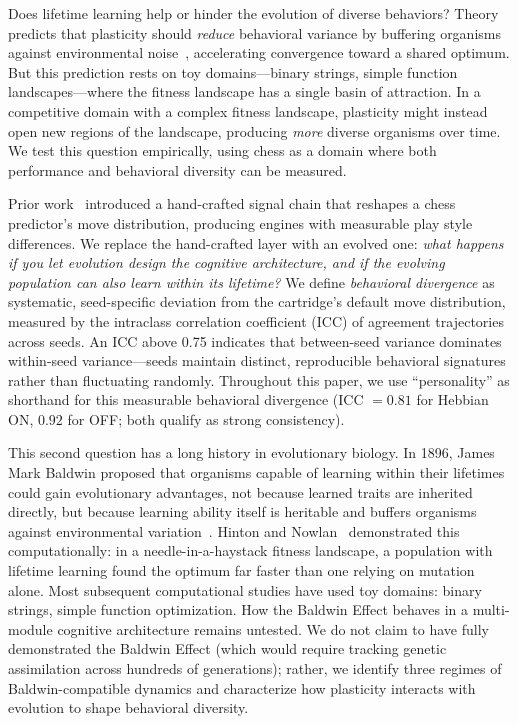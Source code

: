 \documentclass[11pt,a4paper]{article}
\begin{document}
Does lifetime learning help or hinder the evolution of diverse behaviors?
Theory predicts that plasticity should \emph{reduce} behavioral variance by buffering organisms against environmental noise~\citep{paenke2009baldwin}, accelerating convergence toward a shared optimum.
But this prediction rests on toy domains---binary strings, simple function landscapes---where the fitness landscape has a single basin of attraction.
In a competitive domain with a complex fitness landscape, plasticity might instead open new regions of the landscape, producing \emph{more} diverse organisms over time.
We test this question empirically, using chess as a domain where both performance and behavioral diversity can be measured.

Prior work~\citep{resendez2026ailed} introduced a hand-crafted signal chain that reshapes a chess predictor's move distribution, producing engines with measurable play style differences.
We replace the hand-crafted layer with an evolved one: \emph{what happens if you let evolution design the cognitive architecture, and if the evolving population can also learn within its lifetime?}
We define \emph{behavioral divergence} as systematic, seed-specific deviation from the cartridge's default move distribution, measured by the intraclass correlation coefficient (ICC) of agreement trajectories across seeds.
An ICC above 0.75 indicates that between-seed variance dominates within-seed variance---seeds maintain distinct, reproducible behavioral signatures rather than fluctuating randomly.
Throughout this paper, we use ``personality'' as shorthand for this measurable behavioral divergence (ICC $= 0.81$ for Hebbian ON, $0.92$ for OFF; both qualify as strong consistency).

This second question has a long history in evolutionary biology.
In 1896, James Mark Baldwin proposed that organisms capable of learning within their lifetimes could gain evolutionary advantages, not because learned traits are inherited directly, but because learning ability itself is heritable and buffers organisms against environmental variation~\citep{baldwin1896}.
Hinton and Nowlan~\citep{hinton1987} demonstrated this computationally: in a needle-in-a-haystack fitness landscape, a population with lifetime learning found the optimum far faster than one relying on mutation alone.
Most subsequent computational studies have used toy domains: binary strings, simple function optimization.
How the Baldwin Effect behaves in a multi-module cognitive architecture remains untested.
We do not claim to have fully demonstrated the Baldwin Effect (which would require tracking genetic assimilation across hundreds of generations); rather, we identify three regimes of Baldwin-compatible dynamics and characterize how plasticity interacts with evolution to shape behavioral diversity.
\end{document}
